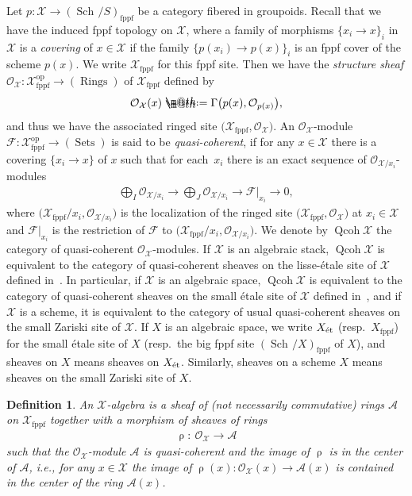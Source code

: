 \documentclass[10pt,a4paper]{amsart}
\makeatletter
\newtheorem{dfn}{Definition}[section]
\newcommand*{\defeq}{\mathrel{\rlap{%
 \raisebox{0.3ex}{$\m@th\cdot$}}%
 \raisebox{-0.3ex}{$\m@th\cdot$}}%
 =}
\numberwithin{equation}{section}
\newcommand{\Qcoh}{\operatorname{Qcoh}}
\newcommand{\Sch}{\operatorname{Sch\!}}
\newcommand{\fppf}{\operatorname{fppf}}
\newcommand{\Rings}{\operatorname{Rings}}
\newcommand{\Sets}{\operatorname{Sets}}
\newcommand{\op}{\operatorname{op}}
\newcommand{\et}{\text{\rm \'et}}
\newcommand{\cA}{\mathcal{A}}
\newcommand{\cF}{\mathcal{F}}
\newcommand{\cO}{\mathcal{O}}
\newcommand{\cX}{\mathcal{X}}
\makeatother
\begin{document}
Let $p\colon \cX\to (\Sch/S)_{\fppf}$ be a category fibered in groupoids. Recall that we have the induced fppf topology on $\cX$, where a family of morphisms $\{x_i\to x\}_{i}$ in $\cX$ is a {\it covering} of $x\in \cX$ if the family $\{ p(x_i)\to p(x)\}_i$ is an fppf cover of the scheme $p(x)$. We write $\cX_{\fppf}$ for this fppf site. Then we have the {\it structure sheaf} $\cO_{\cX}\colon \cX_{\fppf}^{\op}\to (\Rings)$ of $\cX_{\fppf}$ defined by
\begin{gather*}
\cO_{\cX}(x)\defeq\Gamma\big(p(x),\cO_{p(x)}\big),
\end{gather*}
and thus we have the associated ringed site $\big(\cX_{\fppf},\cO_{\cX}\big)$. An $\cO_{\cX}$-module $\cF\colon\cX_{\fppf}^{\op}\to (\Sets)$ is said to be {\it quasi-coherent}, if for any $x\in \cX$ there is a covering $\{x_i\to x\}$ of $x$ such that for each~$x_i$ there is an exact sequence of $\cO_{\cX/x_i}$-modules
\begin{gather*}
\bigoplus_{I}\cO_{\cX/x_i}\to \bigoplus_{J}\cO_{\cX/x_i}\to\cF|_{x_i}\to 0,
\end{gather*}
 where $\big(\cX_{\fppf}/x_i,\cO_{\cX/x_i}\big)$ is the localization of the ringed site $\big(\cX_{\fppf},\cO_{\cX}\big)$ at $x_i\in\cX$ and $\cF|_{x_i}$ is the restriction of $\cF$ to $\big(\cX_{\fppf}/x_i,\cO_{\cX/x_i}\big)$. We denote by $\Qcoh \cX$ the category of quasi-coherent $\cO_{\cX}$-modules. If $\cX$ is an algebraic stack, $\Qcoh \cX$ is equivalent to the category of quasi-coherent sheaves on the lisse-\'etale site of $\cX$ defined in~\cite[Definition 9.1.14]{olsson}. In particular, if $\cX$ is an algebraic space, $\Qcoh \cX$ is equivalent to the category of quasi-coherent sheaves on the small \'etale site of $\cX$ defined in~\cite[Definition 7.1.5]{olsson}, and if $\cX$ is a scheme, it is equivalent to the category of usual quasi-coherent sheaves on the small Zariski site of $\cX$. If $X$ is an algebraic space, we write $X_{\et}$ (resp.\ $X_{\fppf}$) for the small \'etale site of $X$ (resp.\ the big fppf site $(\Sch/X)_{\fppf}$ of $X$), and sheaves on $X$ means sheaves on $X_{\et}$. Similarly, sheaves on a scheme $X$ means sheaves on the small Zariski site of $X$.


 \begin{dfn} An {\it ${\cX}$-algebra} is a sheaf of (not necessarily commutative) rings $\cA$ on $\cX_{\fppf}$ together with a morphism of sheaves of rings
 \begin{gather*}
 \uprho\colon\ \cO_{\cX}\to \cA
 \end{gather*}
 such that the $\cO_{\cX}$-module $\cA$ is quasi-coherent and the image of $\uprho$ is in the center of $\cA$, i.e., for any $x\in \cX$ the image of $\uprho(x)\colon \cO_{\cX}(x)\to \cA(x)$ is contained in the center of the ring $\cA(x)$.
\end{dfn}
\end{document}
